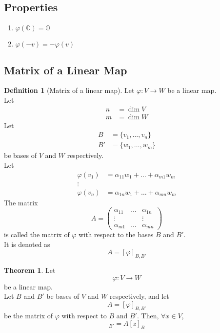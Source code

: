 \documentclass[fleqn, a4paper, 12pt]{article}
\theoremstyle{definition}
\newtheorem{definition}{Definition} %
\theoremstyle{theorem}
\newtheorem{theorem}{Theorem} %
\theoremstyle{remark}
\numberwithin{corollary}{theorem}
\numberwithin{equation}{theorem}
\begin{document}
\subsection{Properties}

\begin{enumerate}
	\item $\varphi (\mathbb{O}) = \mathbb{O}$
	\item $\varphi (-v) = - \varphi (v)$
\end{enumerate}

\subsection{Matrix of a Linear Map}

\begin{definition}[Matrix of a linear map]
	Let $\varphi : V \to W$ be a linear map.\\
	Let
	\begin{align*}
		n &= \dim V\\
		m &= \dim W
	\end{align*}
	Let
	\begin{align*}
		B &= \{v_1, \dots, v_n\}\\
		B' &= \{w_1, \dots, w_m\}
	\end{align*}
	be bases of $V$ and $W$ respectively.\\
	Let 
	\begin{align*}
		\varphi (v_1) &= \alpha_{11} w_{1} + \dots + \alpha_{m1} w_{m}\\
		\vdots\\
		\varphi (v_n) &= \alpha_{1n} w_{1} + \dots + \alpha_{mn} w_{m}
	\end{align*}
	The matrix
	\begin{equation*}
		A = 
		\begin{pmatrix}
			\alpha_{11} & \dots & \alpha_{1n}\\
			\vdots & & \vdots\\
			\alpha_{m1} & \dots & \alpha_{mn}
		\end{pmatrix}
	\end{equation*}
	is called the matrix of $\varphi$ with respect to the bases $B$ and $B'$.\\
	It is denoted as
	\begin{equation*}
		A = [\varphi]_{B, B'}
	\end{equation*}
\end{definition}

\begin{theorem}
	Let 
	\begin{equation*}
		\varphi : V \to W
	\end{equation*}
	be a linear map.\\
	Let $B$ and $B'$ be bases of $V$ and $W$ respectively, and let 
	\begin{equation*}
		A = [\varphi]_{B, B'}
	\end{equation*}
	be the matrix of $\varphi$ with respect to $B$ and $B'$. Then, $\forall x \in V$,
	\begin{equation*}
		[\varphi(z)]_{B'} = A [z]_B
	\end{equation*}
\end{theorem}
\end{document}
